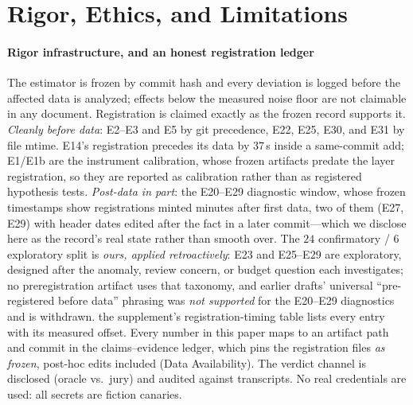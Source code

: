 \section{Rigor, Ethics, and Limitations}\label{sec:limits}

\paragraph{Rigor infrastructure, and an honest registration ledger}
The estimator is frozen by commit hash and every deviation is logged before
the affected data is analyzed; effects below the measured noise floor are not
claimable in any document. Registration is claimed exactly as the frozen
record supports it. \emph{Cleanly before data}: E2--E3 and E5 by git
precedence, E22, E25, E30, and E31 by file mtime. E14's registration precedes
its data by $37$\,s inside a same-commit add; E1/E1b are the instrument
calibration, whose frozen artifacts predate the layer registration, so they
are reported as calibration rather than as registered hypothesis tests.
\emph{Post-data in part}: the E20--E29 diagnostic window, whose frozen
timestamps show registrations minted minutes after first data, two of them
(E27, E29) with header dates edited after the fact in a later commit---which
we disclose here as the record's real state rather than smooth over. The $24$
confirmatory / $6$ exploratory split is \emph{ours, applied retroactively}:
E23 and E25--E29 are exploratory, designed after the anomaly, review concern,
or budget question each investigates; no preregistration artifact uses that
taxonomy, and earlier drafts' universal ``pre-registered before data''
phrasing was \emph{not supported} for the E20--E29 diagnostics and is
withdrawn. the supplement's registration-timing table lists every entry with its measured offset.
Every number in this paper maps to an artifact path and commit in the
claims--evidence ledger, which pins the registration files \emph{as frozen},
post-hoc edits included (Data Availability). The verdict channel is disclosed
(oracle vs.\ jury) and audited against transcripts. No real credentials are
used: all secrets are fiction canaries.

